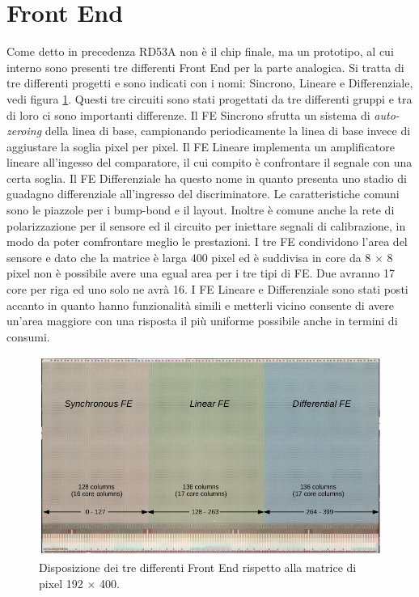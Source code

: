 \section{Front End}
Come detto in precedenza RD53A non è il chip finale, ma un prototipo, al cui interno sono presenti tre differenti Front End per la parte analogica. 
Si tratta di tre differenti progetti e sono indicati con i nomi: Sincrono, Lineare e Differenziale, vedi figura \ref{FrontEnd}. 
Questi tre circuiti sono stati progettati da tre differenti gruppi e tra di loro ci sono importanti differenze. Il FE Sincrono sfrutta un sistema di \textit{auto-zeroing} della linea di base, campionando periodicamente la linea di base invece di aggiustare la soglia pixel per pixel. 
Il FE Lineare implementa un amplificatore lineare all'ingesso del comparatore, il cui compito è confrontare il segnale con una certa soglia. 
Il FE Differenziale ha questo nome in quanto presenta uno stadio di guadagno differenziale  all'ingresso del discriminatore. %
Le caratteristiche comuni sono le piazzole per i bump-bond e il layout. Inoltre è comune anche la rete di polarizzazione per il sensore ed il circuito per iniettare segnali di calibrazione, in modo da poter comfrontare meglio le prestazioni. 
I tre FE condividono l'area del sensore e dato che la matrice è larga 400 pixel ed è suddivisa in core da 8 $\times$ 8 pixel non è possibile avere una egual area per i tre tipi di FE. Due avranno 17 core per riga ed uno solo ne avrà 16. I FE Lineare e Differenziale sono stati posti accanto in quanto hanno funzionalità simili e metterli vicino consente di avere un'area maggiore con una risposta il più uniforme possibile anche in termini di consumi. 
\begin{figure}
\centering
\includegraphics[scale=.3]{Immagini/FrontEnd}
\caption{Disposizione dei tre differenti Front End rispetto alla matrice di pixel 192 $\times$ 400.}
\label{FrontEnd}
\end{figure}
